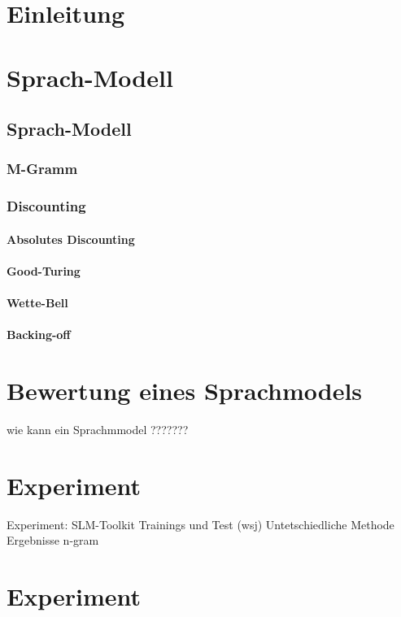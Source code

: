 \chapter{Einleitung}
\label{chapter:Einleitung}
	
	
\chapter{Sprach-Modell}
\label{chapter:Sprach-Modell}

\section{Sprach-Modell}
	

	\subsection{M-Gramm}
  
  
  \subsection{Discounting}
  
  
  	\subsubsection{Absolutes Discounting}
  			
		\subsubsection{Good-Turing}
		
		\subsubsection{Wette-Bell}
		
		\subsubsection{Backing-off}
		
\chapter{Bewertung eines Sprachmodels}
\label{chapter:bewertung_sprachmodel}
wie kann ein Sprachmmodel ???????

\chapter{Experiment}
\label{chapter:Experiment}

	Experiment:
		SLM-Toolkit
		Trainings und Test (wsj)
		Untetschiedliche Methode
		Ergebnisse
		   n-gram
		   
\chapter{Experiment}
\label{chapter:Experiment}
 